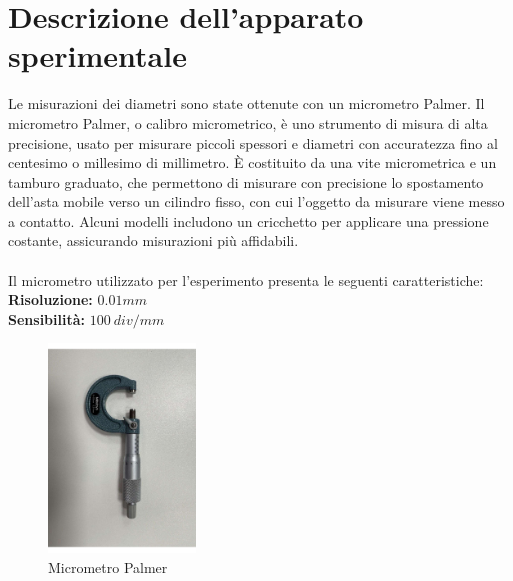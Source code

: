 \documentclass[11pt]{article}
\begin{document}
\section{Descrizione dell'apparato sperimentale}
Le misurazioni dei diametri sono state ottenute con un micrometro Palmer. Il micrometro Palmer, o calibro micrometrico, è uno strumento di misura di alta precisione, usato per misurare piccoli spessori e diametri con accuratezza fino al centesimo o millesimo di millimetro. È costituito da una vite micrometrica e un tamburo graduato, che permettono di misurare con precisione lo spostamento dell'asta mobile verso un cilindro fisso, con cui l'oggetto da misurare viene messo a contatto. Alcuni modelli includono un cricchetto per applicare una pressione costante, assicurando misurazioni più affidabili.
\\\\
Il micrometro utilizzato per l'esperimento presenta le seguenti caratteristiche:
\\ \textbf{Risoluzione:} $0.01mm$
\\ \textbf{Sensibilità:} $100\ div/mm$
\begin{figure}[H]
  \centering
  \includegraphics[width=0.35\textwidth]{micrometro.pdf}
  \caption{Micrometro Palmer}
\end{figure}
\end{document}
